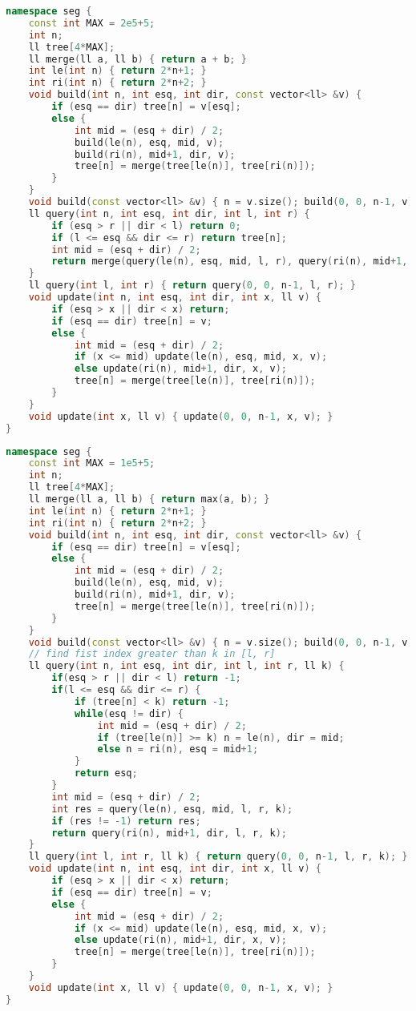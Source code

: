 \documentclass[11pt, a4paper, twoside]{article}
\begin{document}
\begin{lstlisting}[language=C++]
namespace seg {
    const int MAX = 2e5+5;
    int n;
    ll tree[4*MAX];
    ll merge(ll a, ll b) { return a + b; }
    int le(int n) { return 2*n+1; }
    int ri(int n) { return 2*n+2; }
    void build(int n, int esq, int dir, const vector<ll> &v) {
        if (esq == dir) tree[n] = v[esq];
        else {
            int mid = (esq + dir) / 2;
            build(le(n), esq, mid, v);
            build(ri(n), mid+1, dir, v);
            tree[n] = merge(tree[le(n)], tree[ri(n)]);
        }
    }
    void build(const vector<ll> &v) { n = v.size(); build(0, 0, n-1, v); }
    ll query(int n, int esq, int dir, int l, int r) {
        if (esq > r || dir < l) return 0;
        if (l <= esq && dir <= r) return tree[n];
        int mid = (esq + dir) / 2;
        return merge(query(le(n), esq, mid, l, r), query(ri(n), mid+1, dir, l, r));
    }
    ll query(int l, int r) { return query(0, 0, n-1, l, r); }
    void update(int n, int esq, int dir, int x, ll v) {
        if (esq > x || dir < x) return;
        if (esq == dir) tree[n] = v;
        else {
            int mid = (esq + dir) / 2;
            if (x <= mid) update(le(n), esq, mid, x, v);
            else update(ri(n), mid+1, dir, x, v);
            tree[n] = merge(tree[le(n)], tree[ri(n)]);
        }
    }
    void update(int x, ll v) { update(0, 0, n-1, x, v); }
}
\end{lstlisting}

\begin{lstlisting}[language=C++]
namespace seg {
    const int MAX = 1e5+5;
    int n;
    ll tree[4*MAX];
    ll merge(ll a, ll b) { return max(a, b); }
    int le(int n) { return 2*n+1; }
    int ri(int n) { return 2*n+2; }
    void build(int n, int esq, int dir, const vector<ll> &v) {
        if (esq == dir) tree[n] = v[esq];
        else {
            int mid = (esq + dir) / 2;
            build(le(n), esq, mid, v);
            build(ri(n), mid+1, dir, v);
            tree[n] = merge(tree[le(n)], tree[ri(n)]);
        }
    }
    void build(const vector<ll> &v) { n = v.size(); build(0, 0, n-1, v); }
    // find fist index greater than k in [l, r]
    ll query(int n, int esq, int dir, int l, int r, ll k) {
        if(esq > r || dir < l) return -1;
        if(l <= esq && dir <= r) {
            if (tree[n] < k) return -1;
            while(esq != dir) {
                int mid = (esq + dir) / 2;
                if (tree[le(n)] >= k) n = le(n), dir = mid;
                else n = ri(n), esq = mid+1;
            }
            return esq;
        }
        int mid = (esq + dir) / 2;
        int res = query(le(n), esq, mid, l, r, k);
        if (res != -1) return res;
        return query(ri(n), mid+1, dir, l, r, k);
    }
    ll query(int l, int r, ll k) { return query(0, 0, n-1, l, r, k); }
    void update(int n, int esq, int dir, int x, ll v) {
        if (esq > x || dir < x) return;
        if (esq == dir) tree[n] = v;
        else {
            int mid = (esq + dir) / 2;
            if (x <= mid) update(le(n), esq, mid, x, v);
            else update(ri(n), mid+1, dir, x, v);
            tree[n] = merge(tree[le(n)], tree[ri(n)]);
        }
    }
    void update(int x, ll v) { update(0, 0, n-1, x, v); }
}
\end{lstlisting}
\end{document}
